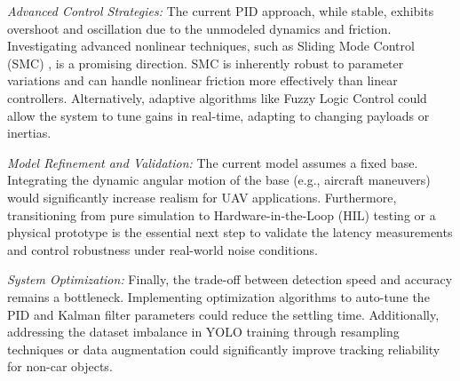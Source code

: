 \documentclass[conference]{IEEEtran}
\begin{document}
\emph{Advanced Control Strategies:} The current PID approach, while stable, exhibits overshoot and oscillation due to the unmodeled dynamics and friction. Investigating advanced nonlinear techniques, such as Sliding Mode Control (SMC) \cite{Rahmat2016Sliding}, is a promising direction. SMC is inherently robust to parameter variations and can handle nonlinear friction more effectively than linear controllers. Alternatively, adaptive algorithms like Fuzzy Logic Control \cite{Galal2009Fuzzy} could allow the system to tune gains in real-time, adapting to changing payloads or inertias.

\emph{Model Refinement and Validation:} The current model assumes a fixed base. Integrating the dynamic angular motion of the base (e.g., aircraft maneuvers) \cite{boiffier1998dynamics} would significantly increase realism for UAV applications. Furthermore, transitioning from pure simulation to Hardware-in-the-Loop (HIL) testing or a physical prototype is the essential next step to validate the latency measurements and control robustness under real-world noise conditions.

\emph{System Optimization:} Finally, the trade-off between detection speed and accuracy remains a bottleneck. Implementing optimization algorithms to auto-tune the PID and Kalman filter parameters could reduce the settling time. Additionally, addressing the dataset imbalance in YOLO training through resampling techniques or data augmentation could significantly improve tracking reliability for non-car objects.






\end{document}
